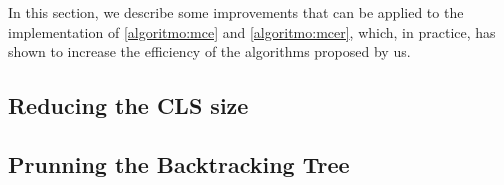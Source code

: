 In this section, we describe some improvements that can be applied to the implementation of \autoref{algoritmo:mce} and \autoref{algoritmo:mcer}, which, in practice, has shown to increase the efficiency of the algorithms proposed by us.

\subsection{Reducing the CLS size}\label{section:reducing_cls}


\subsection{Prunning the Backtracking Tree}\label{section:prunning}
